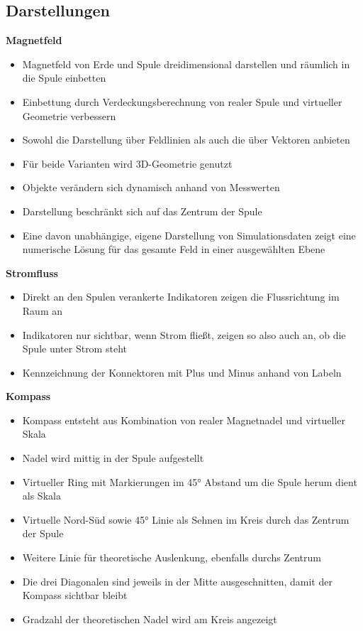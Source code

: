 \subsection{Darstellungen}
\textbf{Magnetfeld}
\begin{itemize}[topsep=-2px]
	\setlength{\itemsep}{-5pt}
	\item Magnetfeld von Erde und Spule dreidimensional darstellen und räumlich in die Spule einbetten
	\item Einbettung durch Verdeckungsberechnung von realer Spule und virtueller Geometrie verbessern
	\item Sowohl die Darstellung über Feldlinien als auch die über Vektoren anbieten
	\item Für beide Varianten wird 3D-Geometrie genutzt
	\item Objekte verändern sich dynamisch anhand von Messwerten
	\item Darstellung beschränkt sich auf das Zentrum der Spule
	\item Eine davon unabhängige, eigene Darstellung von Simulationsdaten zeigt eine numerische Lösung für das gesamte Feld in einer ausgewählten Ebene
\end{itemize}
\vspace{8px}

\textbf{Stromfluss}
\begin{itemize}[topsep=-2px]
	\setlength{\itemsep}{-5pt}
	\item Direkt an den Spulen verankerte Indikatoren zeigen die Flussrichtung im Raum an
	\item Indikatoren nur sichtbar, wenn Strom fließt, zeigen so also auch an, ob die Spule unter Strom steht
	\item Kennzeichnung der Konnektoren mit Plus und Minus anhand von Labeln
\end{itemize}
\vspace{8px}

\textbf{Kompass}
\begin{itemize}[topsep=-2px]
	\setlength{\itemsep}{-5pt}
	\item Kompass entsteht aus Kombination von realer Magnetnadel und virtueller Skala
	\item Nadel wird mittig in der Spule aufgestellt
	\item Virtueller Ring mit Markierungen im 45° Abstand um die Spule herum dient als Skala	
	\item Virtuelle Nord-Süd sowie 45° Linie als Sehnen im Kreis durch das Zentrum der Spule
	\item Weitere Linie für theoretische Auslenkung, ebenfalls durchs Zentrum
	\item Die drei Diagonalen sind jeweils in der Mitte ausgeschnitten, damit der Kompass sichtbar bleibt
	\item Gradzahl der theoretischen Nadel wird am Kreis angezeigt
\end{itemize}
\vspace{8px}

